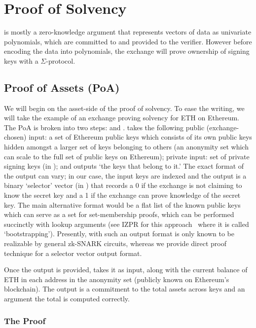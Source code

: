 \chapter{Proof of Solvency}

\Sys is mostly a zero-knowledge argument that represents vectors of data as univariate polynomials, which are committed to and provided to the verifier. However before encoding the data into polynomials, the exchange will prove ownership of signing keys with a $\Sigma$-protocol.

\section{Proof of Assets (PoA)}

We will begin on the asset-side of the proof of solvency. To ease the writing, we will take the example of an exchange proving solvency for ETH on Ethereum. The PoA is broken into two steps: \bootstrap and \poa. \bootstrap takes the following public (exchange-chosen) input: a set of Ethereum public keys which consists of its own public keys hidden amongst a larger set of keys belonging to others (\ie an anonymity set which can scale to the full set of public keys on Ethereum); private input: set of private signing keys (in \secp); and outputs `the keys that belong to it.' The exact format of the output can vary; in our case, the input keys are indexed and the output is a binary `selector' vector (in \bls) that records a 0 if the exchange is not claiming to know the secret key and a 1 if the exchange can prove knowledge of the secret key. The main alternative format would be a flat list of the known public keys which can serve as a set for set-membership proofs, which can be performed succinctly with lookup arguments (see IZPR for this approach~\cite{izpr} where it is called `bootstrapping'). Presently, \bootstrap with such an output format is only known to be realizable by general zk-SNARK circuits, whereas we provide direct proof technique for a selector vector output format.

Once the \bootstrap output is provided, \poa takes it as input, along with the current balance of ETH in each address in the anonymity set (publicly known on Ethereum's blockchain). The output is a commitment to the total assets across keys and an argument the total is computed correctly. 


\subsection{The \bootstrap Proof}


